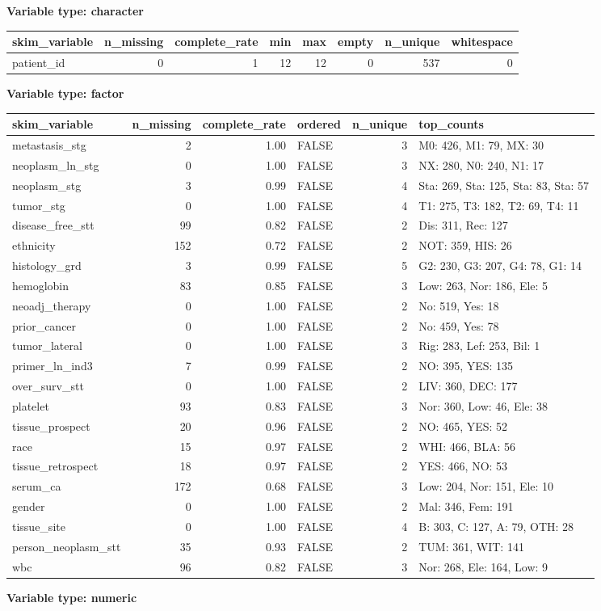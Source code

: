 \documentclass[]{article}
\begin{document}
\textbf{Variable type: character}

\begin{longtable}[]{@{}lrrrrrrr@{}}
\toprule
skim\_variable & n\_missing & complete\_rate & min & max & empty &
n\_unique & whitespace\tabularnewline
\midrule
\endhead
patient\_id & 0 & 1 & 12 & 12 & 0 & 537 & 0\tabularnewline
\bottomrule
\end{longtable}

\textbf{Variable type: factor}

\begin{longtable}[]{@{}lrrlrl@{}}
\toprule
skim\_variable & n\_missing & complete\_rate & ordered & n\_unique &
top\_counts\tabularnewline
\midrule
\endhead
metastasis\_stg & 2 & 1.00 & FALSE & 3 & M0: 426, M1: 79, MX:
30\tabularnewline
neoplasm\_ln\_stg & 0 & 1.00 & FALSE & 3 & NX: 280, N0: 240, N1:
17\tabularnewline
neoplasm\_stg & 3 & 0.99 & FALSE & 4 & Sta: 269, Sta: 125, Sta: 83, Sta:
57\tabularnewline
tumor\_stg & 0 & 1.00 & FALSE & 4 & T1: 275, T3: 182, T2: 69, T4:
11\tabularnewline
disease\_free\_stt & 99 & 0.82 & FALSE & 2 & Dis: 311, Rec:
127\tabularnewline
ethnicity & 152 & 0.72 & FALSE & 2 & NOT: 359, HIS: 26\tabularnewline
histology\_grd & 3 & 0.99 & FALSE & 5 & G2: 230, G3: 207, G4: 78, G1:
14\tabularnewline
hemoglobin & 83 & 0.85 & FALSE & 3 & Low: 263, Nor: 186, Ele:
5\tabularnewline
neoadj\_therapy & 0 & 1.00 & FALSE & 2 & No: 519, Yes: 18\tabularnewline
prior\_cancer & 0 & 1.00 & FALSE & 2 & No: 459, Yes: 78\tabularnewline
tumor\_lateral & 0 & 1.00 & FALSE & 3 & Rig: 283, Lef: 253, Bil:
1\tabularnewline
primer\_ln\_ind3 & 7 & 0.99 & FALSE & 2 & NO: 395, YES:
135\tabularnewline
over\_surv\_stt & 0 & 1.00 & FALSE & 2 & LIV: 360, DEC:
177\tabularnewline
platelet & 93 & 0.83 & FALSE & 3 & Nor: 360, Low: 46, Ele:
38\tabularnewline
tissue\_prospect & 20 & 0.96 & FALSE & 2 & NO: 465, YES:
52\tabularnewline
race & 15 & 0.97 & FALSE & 2 & WHI: 466, BLA: 56\tabularnewline
tissue\_retrospect & 18 & 0.97 & FALSE & 2 & YES: 466, NO:
53\tabularnewline
serum\_ca & 172 & 0.68 & FALSE & 3 & Low: 204, Nor: 151, Ele:
10\tabularnewline
gender & 0 & 1.00 & FALSE & 2 & Mal: 346, Fem: 191\tabularnewline
tissue\_site & 0 & 1.00 & FALSE & 4 & B: 303, C: 127, A: 79, OTH:
28\tabularnewline
person\_neoplasm\_stt & 35 & 0.93 & FALSE & 2 & TUM: 361, WIT:
141\tabularnewline
wbc & 96 & 0.82 & FALSE & 3 & Nor: 268, Ele: 164, Low: 9\tabularnewline
\bottomrule
\end{longtable}

\textbf{Variable type: numeric}
\end{document}
